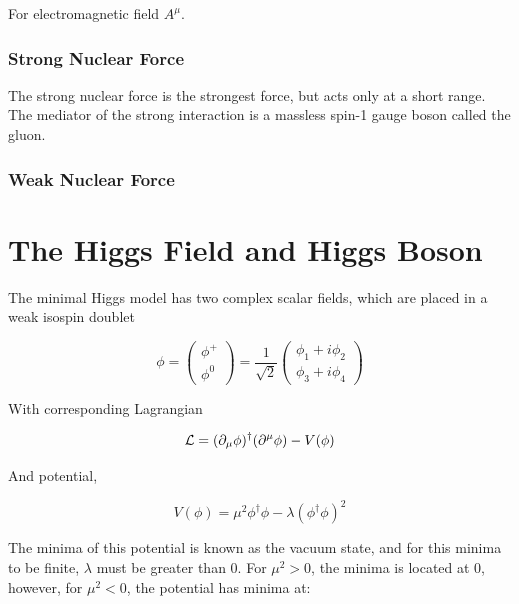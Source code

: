 For electromagnetic field $A^{\mu}$.

\subsubsection{Strong Nuclear Force}

The strong nuclear force is the strongest force, but acts only at a short range. The mediator of the strong interaction is a massless spin-1 gauge boson called the gluon.

\subsubsection{Weak Nuclear Force}


\section{The Higgs Field and Higgs Boson}

The minimal Higgs model has two complex scalar fields, which are placed in a weak isospin doublet

\begin{equation}
\phi = \begin{pmatrix} \phi^+ \\ \phi^0 \end{pmatrix}
    = \frac{1}{\sqrt{2}}\begin{pmatrix}
        \phi_1 + i\phi_2 \\ \phi_3 + i\phi_4
    \end{pmatrix}
\end{equation}

With corresponding Lagrangian

\begin{equation} \label{higgs-lagrangian}
    \mathcal{L} = (\partial_{\mu}\phi)^\dagger (\partial^{\mu}\phi) - V(\phi)\\
\end{equation}

And potential,

\begin{equation} \label{higgs-potential}
    V(\phi) = \mu^2\phi^\dagger \phi - \lambda(\phi^\dagger \phi)^2
\end{equation}

The minima of this potential is known as the vacuum state, and for this minima to be finite, $\lambda$ must be greater than 0. For $\mu^2 >0$, the minima is located at 0, however, for $\mu^2<0$, the potential has minima at:

